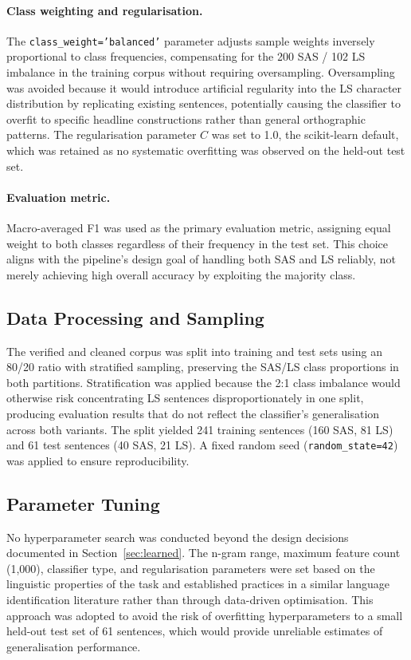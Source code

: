 \documentclass[12pt]{ThesisRU}
\begin{document}
\paragraph{Class weighting and regularisation.}
The \texttt{class\_weight='balanced'} parameter adjusts sample
weights inversely proportional to class frequencies, compensating
for the 200 SAS / 102 LS imbalance in the training corpus without
requiring oversampling. Oversampling was avoided because it would
introduce artificial regularity into the LS character distribution
by replicating existing sentences, potentially causing the
classifier to overfit to specific headline constructions rather
than general orthographic patterns. The regularisation parameter
$C$ was set to 1.0, the scikit-learn default, which was retained
as no systematic overfitting was observed on the held-out test
set.

\paragraph{Evaluation metric.}
Macro-averaged F1 was used as the primary evaluation metric,
assigning equal weight to both classes regardless of their
frequency in the test set. This choice aligns with the pipeline's
design goal of handling both SAS and LS reliably, not merely
achieving high overall accuracy by exploiting the majority class.


\subsection{Data Processing and Sampling }

The verified and cleaned corpus was split into training and test
sets using an 80/20 ratio with stratified sampling, preserving the
SAS/LS class proportions in both partitions. Stratification was
applied because the 2:1 class imbalance would otherwise risk
concentrating LS sentences disproportionately in one split,
producing evaluation results that do not reflect the classifier's
generalisation across both variants. The split yielded 241 training
sentences (160 SAS, 81 LS) and 61 test sentences (40 SAS, 21 LS).
A fixed random seed (\texttt{random\_state=42}) was applied to
ensure reproducibility.

\subsection{Parameter Tuning}

No hyperparameter search was conducted beyond the design decisions
documented in Section~\ref{sec:learned}. The n-gram range, maximum
feature count (1,000), classifier type, and regularisation
parameters were set based on the linguistic properties of
the task and established practices in a similar language
identification literature \citep{cianflone2016n,
de2024data} rather than through data-driven optimisation.
This approach was adopted to avoid the risk of overfitting
hyperparameters to a small held-out test set of 61 sentences, which
would provide unreliable estimates of generalisation performance.
\end{document}
